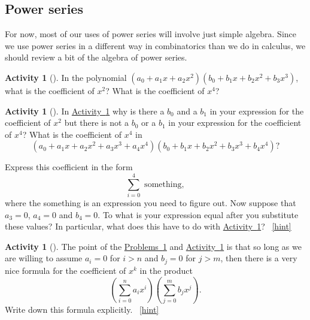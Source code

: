 \documentclass[10pt,]{book}
\theoremstyle{plain}
\theoremstyle{definition}
\theoremstyle{definition}
\theoremstyle{definition}
\newtheorem{activity}[project]{Activity}
\numberwithin{equation}{chapter}
\begin{document}
\subsection[{Power series}]{Power series}\label{subsection-33}
\hypertarget{p-1285}{}%
For now, most of our uses of power series will involve just simple algebra. Since we use power series in a different way in combinatorics than we do in calculus, we should review a bit of the algebra of power series.%
\begin{activity}[]\label{coeffinproduct}
\hypertarget{p-1286}{}%
In the polynomial \((a_0 +a_1x+a_2x^2)(b_0+b_1x+b_2x^2+b_3x^3)\), what is the coefficient of \(x^2\)? What is the coefficient of \(x^4\)?%
\end{activity}
\begin{activity}[]\label{coeffinproduct1}
\hypertarget{p-1288}{}%
In \hyperref[coeffinproduct]{Activity~\ref{coeffinproduct}} why is there a \(b_0\) and a \(b_1\) in your expression for the coefficient of \(x^2\) but there is not a \(b_0\) or a \(b_1\) in your expression for the coefficient of \(x^4\)? What is the coefficient of \(x^4\) in%
\begin{equation*}
(a_0+a_1x+a_2x^2+a_3x^3+a_4x^4)(b_0+b_1x+b_2x^2
+b_3x^3+b_4x^4)?
\end{equation*}
%
\par
\hypertarget{p-1289}{}%
Express this coefficient in the form%
\begin{equation*}
\sum_{i=0}^4 \mbox{ something} ,
\end{equation*}
where the something is an expression you need to figure out. Now suppose that \(a_3=0\), \(a_4=0\) and \(b_4=0\). To what is your expression equal after you substitute these values? In particular, what does this have to do with \hyperref[coeffinproduct]{Activity~\ref{coeffinproduct}}?%
~\hfill{\tiny\hyperlink{a-246}{[hint]}\hypertarget{q-246}{}}\end{activity}
\begin{activity}[]\label{coeffinproduct2}
\hypertarget{p-1293}{}%
The point of the \hyperref[coeffinproduct]{Problems~\ref{coeffinproduct}} and \hyperref[coeffinproduct1]{Activity~\ref{coeffinproduct1}} is that so long as we are willing to assume \(a_i=0\) for \(i>n\) and \(b_j =0\) for \(j>m\), then there is a very nice formula for the coefficient of \(x^k\) in the product%
\begin{equation*}
\left(\sum_{i=0}^n a_ix^i\right)\left(\sum_{j=0}^m b_jx^j\right).
\end{equation*}
Write down this formula explicitly.%
~\hfill{\tiny\hyperlink{a-247}{[hint]}\hypertarget{q-247}{}}\end{activity}
\end{document}
